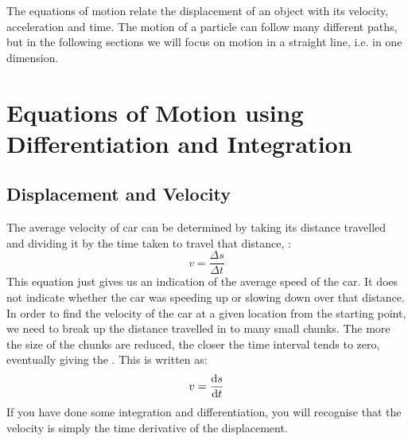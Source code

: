 





\addtolength{\topmargin}{-0.7 cm}
\setlength{\columnsep}{22pt}
\nll
The equations of motion relate the displacement of an object with its velocity, acceleration and time. The motion of a particle can follow many different paths, but in the following sections we will focus on motion in a straight line, i.e. in one dimension. 

\section{Equations of Motion using Differentiation and Integration}
\subsection{Displacement and Velocity}
The average velocity  of car can be determined by taking its distance travelled  and dividing it by the time taken to travel that distance, :
\begin{equation}
v = \frac{\Delta s}{\Delta t}   
\end{equation}
This equation just gives us an indication of the average speed of the car. It does not indicate whether the car was speeding up or slowing down over that distance. In order to find the velocity of the car at a given location from the starting point, we need to break up the distance travelled in to many small chunks. The more the size of the chunks are reduced, the closer the time interval tends to zero, eventually giving the . This is written as:
\begin{equation}
v = \frac{\operatorname{d}\! s}{\operatorname{d}\! t} \label{inst_v}
\end{equation}
If you have done some integration and differentiation, you will recognise that the velocity is simply the time derivative of the displacement.
